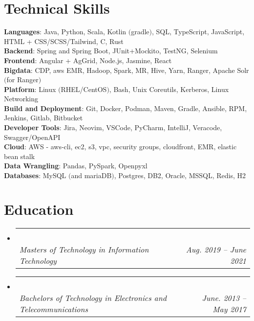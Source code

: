 \documentclass[letterpaper,11pt]{article}
\makeatletter
\newcommand{\resumeItem}[1]{
  \item\small{
    {#1 \vspace{-2pt}}
  }
}
\newcommand{\resumeSubheading}[4]{
  \vspace{-2pt}\item
    \begin{tabular*}{0.97\textwidth}[t]{l@{\extracolsep{\fill}}r}
      \textbf{#1} & #2 \\
      \textit{\small#3} & \textit{\small #4} \\
    \end{tabular*}\vspace{-7pt}
}
\newcommand{\resumeProjectHeading}[2]{
    \item
    \begin{tabular*}{0.97\textwidth}{l@{\extracolsep{\fill}}r}
      \small#1 & #2 \\
    \end{tabular*}\vspace{-7pt}
}
\newcommand{\resumeSubHeadingListStart}{\begin{itemize}[leftmargin=0.15in, label={}]}
\newcommand{\resumeSubHeadingListEnd}{\end{itemize}}
\newcommand{\resumeItemListStart}{\begin{itemize}}
\newcommand{\resumeItemListEnd}{\end{itemize}\vspace{-5pt}}
\makeatother
\begin{document}
\section{Technical Skills}
 \begin{itemize}[leftmargin=0.15in, label={}]
    \small{\item{
     \textbf{Languages}{: Java, Python, Scala, Kotlin $($gradle$)$, SQL, TypeScript, JavaScript, HTML + CSS/SCSS/Tailwind, C, Rust} \\
     \textbf{Backend}{: Spring and Spring Boot, JUnit+Mockito, TestNG, Selenium } \\
     \textbf{Frontend}{: Angular + AgGrid, Node.js, Jasmine, React} \\
     \textbf{Bigdata}{: CDP, aws EMR, Hadoop, Spark, MR, Hive, Yarn, Ranger, Apache Solr $($for Ranger$)$} \\
     \textbf{Platform}{: Linux $($RHEL/CentOS$)$, Bash, Unix Coreutils, Kerberos, Linux Networking } \\
     \textbf{Build and Deployment}{: Git, Docker, Podman, Maven, Gradle, Ansible, RPM, Jenkins, Gitlab, Bitbucket} \\
     \textbf{Developer Tools}{: Jira, Neovim, VSCode, PyCharm, IntelliJ, Veracode, Swagger/OpenAPI} \\
     \textbf{Cloud}{: AWS - aws-cli, ec2, s3, vpc, security groups, cloudfront, EMR, elastic bean stalk} \\
     \textbf{Data Wrangling}{: Pandas, PySpark,  Openpyxl}\\
     \textbf{Databases}{: MySQL $($and mariaDB$)$, Postgres, DB2, Oracle, MSSQL, Redis, H2}
    }}
 \end{itemize}

\section{Education}
  \resumeSubHeadingListStart
    \resumeSubheading
      {\mastersUNI\ }{\mastersAdd\ }
      {Masters of Technology in Information Technology}{Aug. 2019 -- June 2021}
    \resumeSubheading
      {\bachUNI\ }{\bachAdd\ }
      {Bachelors of Technology in Electronics and Telecommunications}{June. 2013 -- May 2017}
  \resumeSubHeadingListEnd


%



\end{document}
